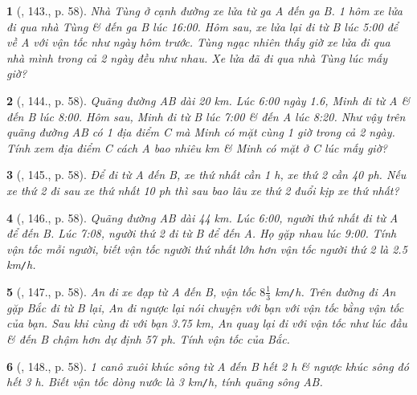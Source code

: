 \documentclass{article}
\newtheorem{baitoan}{}
\begin{document}
\begin{baitoan}[\cite{Binh_Toan_6_tap_2}, 143., p. 58]
	Nhà Tùng ở cạnh đường xe lửa từ ga A đến ga B. 1 hôm xe lửa đi qua nhà Tùng \& đến ga B lúc {\rm16:00}. Hôm sau, xe lửa lại đi từ B lúc {\rm5:00} để về A với vận tốc như ngày hôm trước. Tùng ngạc nhiên thấy giờ xe lửa đi qua nhà mình trong cả 2 ngày đều như nhau. Xe lửa đã đi qua nhà Tùng lúc mấy giờ?
\end{baitoan}

\begin{baitoan}[\cite{Binh_Toan_6_tap_2}, 144., p. 58]
	Quãng đường AB dài {\rm20 km}. Lúc {\rm6:00} ngày 1.6, Minh đi từ A \& đến B lúc {\rm8:00}. Hôm sau, Minh đi từ B lúc {\rm7:00} \& đến A lúc {\rm8:20}. Như vậy trên quãng đường AB có 1 địa điểm C mà Minh có mặt cùng 1 giờ trong cả 2 ngày. Tính xem địa điểm C cách A bao nhiêu {\rm km} \& Minh có mặt ở C lúc mấy giờ?
\end{baitoan}

\begin{baitoan}[\cite{Binh_Toan_6_tap_2}, 145., p. 58]
	Để đi từ A đến B, xe thứ nhất cần {\rm1 h}, xe thứ 2 cần {\rm40 ph}. Nếu xe thứ 2 đi sau xe thứ nhất {\rm10 ph} thì sau bao lâu xe thứ 2 đuổi kịp xe thứ nhất?
\end{baitoan}

\begin{baitoan}[\cite{Binh_Toan_6_tap_2}, 146., p. 58]
	Quãng đường AB dài {\rm44 km}. Lúc {\rm6:00}, người thứ nhất đi từ A để đến B. Lúc {\rm7:08}, người thứ 2 đi từ B để đến A. Họ gặp nhau lúc {\rm9:00}. Tính vận tốc mỗi người, biết vận tốc người thứ nhất lớn hơn vận tốc người thứ 2 là {\rm2.5 km{\tt/}h}.
\end{baitoan}

\begin{baitoan}[\cite{Binh_Toan_6_tap_2}, 147., p. 58]
	An đi xe đạp từ A đến B, vận tốc $8\frac{1}{3}$ {\rm km{\tt/}h}. Trên đường đi An gặp Bắc đi từ B lại, An đi ngược lại nói chuyện với bạn với vận tốc bằng vận tốc của bạn. Sau khi cùng đi với bạn {\rm3.75 km}, An quay lại đi với vận tốc như lúc đầu \& đến B chậm hơn dự định {\rm57 ph}. Tính vận tốc của Bắc.
\end{baitoan}

\begin{baitoan}[\cite{Binh_Toan_6_tap_2}, 148., p. 58]
	1 canô xuôi khúc sông từ A đến B hết {\rm2 h} \& ngược khúc sông đó hết {\rm3 h}. Biết vận tốc dòng nước là {\rm3 km{\tt/}h}, tính quãng sông AB.
\end{baitoan}
\end{document}

